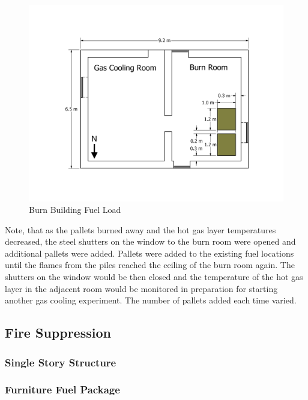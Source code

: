 \documentclass[12pt,oneside]{book}
\begin{document}
\begin{figure}[!ht]
	\includegraphics[width=\columnwidth]{../Figures/Floor_Plans/PDFs/West_Structure/DelCo_2012_West_Structure_Pallets}
	\caption{Burn Building Fuel Load}
	\label{fig:Burn_Building_Fuel_Load}
\end{figure}

Note, that as the pallets burned away and the hot gas layer temperatures decreased, the steel shutters on the window to the burn room were opened and additional pallets were added. Pallets were added to the existing fuel locations until the flames from the piles reached the ceiling of the burn room again. The shutters on the window would be then closed and the temperature of the hot gas layer in the adjacent room would be monitored in preparation for starting another gas cooling experiment.  The number of pallets added each time varied.

\clearpage

\subsection{Fire Suppression}
\label{sec:Fuel_Load_Fire_Suppression}

\subsubsection*{Single Story Structure}
\label{sec:suppresion_single}

\subsubsection{Furniture Fuel Package}
\label{sec:fire_suppression_furniture_fuel}
\end{document}

